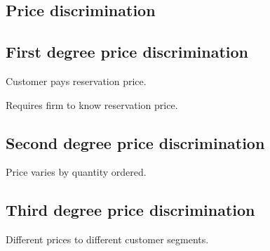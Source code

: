 
\subsection{Price discrimination}

\subsection{First degree price discrimination}

Customer pays reservation price.

Requires firm to know reservation price.

\subsection{Second degree price discrimination}

Price varies by quantity ordered.

\subsection{Third degree price discrimination}

Different prices to different customer segments.

